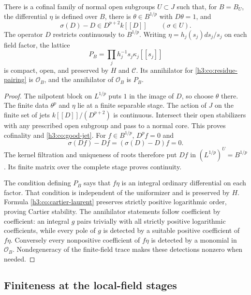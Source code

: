 \begin{lemma}\label{h3:co:good-stages}
There is a cofinal family of normal open subgroups $U\subset J$ such
that, for $B=B_U$, the differential $\eta$ is defined over $B$, there is
$\theta\in B^{1/p}$ with $D\theta=1$, and
\begin{equation}\label{h3:co:good-jet}
 \sigma(D)-D\in D^{p+2}k[[D]]\qquad(\sigma\in U).
\end{equation}
The operator $D$ restricts continuously to $B^{1/p}$.
Writing $\eta=h_j(s_j)ds_j/s_j$ on each field factor, the lattice
\begin{equation}\label{h3:co:positive-differential-lattice}
 P_B=\prod_j h_j^{-1}s_j\kappa_j[[s_j]]
\end{equation}
is compact, open, and preserved by $H$ and $\mathcal C$.
Its annihilator for \eqref{h3:co:residue-pairing} is $\mathcal O_B$, and
the annihilator of $\mathcal O_B$ is $P_B$.
\end{lemma}

\begin{proof}
The nilpotent block on $L^{1/p}$ puts $1$ in the image of $D$, so choose
$\theta$ there.  The finite data $\theta^p$ and $\eta$ lie at a finite
separable stage.  The action of $J$ on the finite set of jets
$k[[D]]/(D^{p+2})$ is continuous.  Intersect their open stabilizers with
any prescribed open subgroup and pass to a normal core.  This proves
cofinality and \eqref{h3:co:good-jet}.  For $f\in B^{1/p}$, $D^pf=0$ and
\[
 \sigma(Df)-Df=(\sigma(D)-D)f=0.
\]
The kernel filtration and uniqueness of roots therefore put $Df$ in
$(L^{1/p})^U=B^{1/p}$.  Its finite matrix over the complete stage proves
continuity.

The condition defining $P_B$ says that $f\eta$ is an integral ordinary
differential on each factor.  That condition is independent of the
uniformizer and is preserved by $H$.  Formula
\eqref{h3:co:cartier-laurent} preserves strictly positive logarithmic
order, proving Cartier stability.  The annihilator statements follow
coefficient by coefficient: an integral $g$ pairs trivially with all
strictly positive logarithmic coefficients, while every pole of $g$
is detected by a suitable positive coefficient of $f\eta$.  Conversely
every nonpositive coefficient of $f\eta$ is detected by a monomial in
$\mathcal O_B$.  Nondegeneracy of the finite-field trace makes these
detections nonzero when needed.
\end{proof}

\subsection{Finiteness at the local-field stages}

